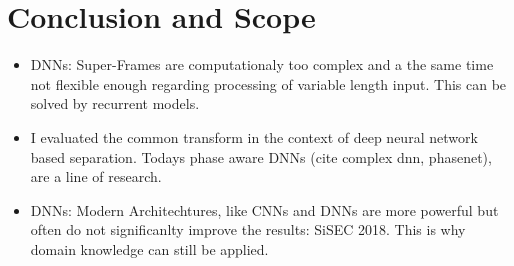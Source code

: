 \section{Conclusion and Scope}

\begin{itemize}
  \item DNNs: Super-Frames are computationaly too complex and a the same time not flexible enough regarding processing of variable length input. This can be solved by recurrent models.
  \item I evaluated the common transform in the context of deep neural network based separation.
  Todays phase aware DNNs (cite complex dnn, phasenet), are a line of research.
  \item DNNs: Modern Architechtures, like CNNs and DNNs are more powerful but often do not significanlty improve the results: SiSEC 2018. This is why domain knowledge can still be applied.
\end{itemize}
